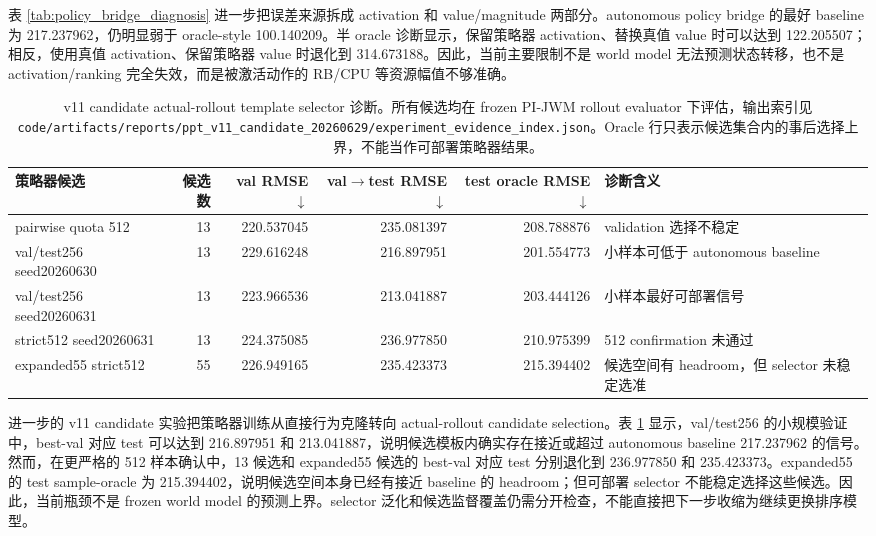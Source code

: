 \documentclass[letterpaper,journal]{IEEEtran}
\newcommand{\code}[1]{\texttt{#1}}
\newcommand{\pjwm}{PI-JWM}
\newcommand{\tabfontsize}{\footnotesize}
\begin{document}
表 \ref{tab:policy_bridge_diagnosis} 进一步把误差来源拆成 activation 和 value/magnitude 两部分。autonomous policy bridge 的最好 baseline 为 217.237962，仍明显弱于 oracle-style 100.140209。半 oracle 诊断显示，保留策略器 activation、替换真值 value 时可以达到 122.205507；相反，使用真值 activation、保留策略器 value 时退化到 314.673188。因此，当前主要限制不是 world model 无法预测状态转移，也不是 activation/ranking 完全失效，而是被激活动作的 RB/CPU 等资源幅值不够准确。

\begin{table}[t]
\centering
\tabfontsize
\begin{tabular}{lrrrrl}
\toprule
策略器候选 & 候选数 & val RMSE$\downarrow$ & val$\rightarrow$test RMSE$\downarrow$ & test oracle RMSE$\downarrow$ & 诊断含义 \\
\midrule
pairwise quota 512 & 13 & 220.537045 & 235.081397 & 208.788876 & validation 选择不稳定 \\
val/test256 seed20260630 & 13 & 229.616248 & 216.897951 & 201.554773 & 小样本可低于 autonomous baseline \\
val/test256 seed20260631 & 13 & 223.966536 & 213.041887 & 203.444126 & 小样本最好可部署信号 \\
strict512 seed20260631 & 13 & 224.375085 & 236.977850 & 210.975399 & 512 confirmation 未通过 \\
expanded55 strict512 & 55 & 226.949165 & 235.423373 & 215.394402 & 候选空间有 headroom，但 selector 未稳定选准 \\
\bottomrule
\end{tabular}
\caption{v11 candidate actual-rollout template selector 诊断。所有候选均在 frozen \pjwm{} rollout evaluator 下评估，输出索引见 \code{code/artifacts/reports/ppt\_v11\_candidate\_20260629/experiment\_evidence\_index.json}。Oracle 行只表示候选集合内的事后选择上界，不能当作可部署策略器结果。}
\label{tab:v11_actual_rollout_selector}
\end{table}

进一步的 v11 candidate 实验把策略器训练从直接行为克隆转向 actual-rollout candidate selection。表 \ref{tab:v11_actual_rollout_selector} 显示，val/test256 的小规模验证中，best-val 对应 test 可以达到 216.897951 和 213.041887，说明候选模板内确实存在接近或超过 autonomous baseline 217.237962 的信号。然而，在更严格的 512 样本确认中，13 候选和 expanded55 候选的 best-val 对应 test 分别退化到 236.977850 和 235.423373。expanded55 的 test sample-oracle 为 215.394402，说明候选空间本身已经有接近 baseline 的 headroom；但可部署 selector 不能稳定选择这些候选。因此，当前瓶颈不是 frozen world model 的预测上界。selector 泛化和候选监督覆盖仍需分开检查，不能直接把下一步收缩为继续更换排序模型。
\end{document}
